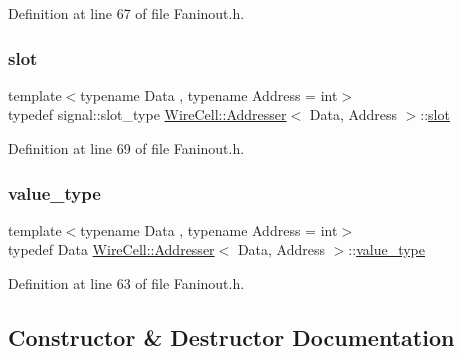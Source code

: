 Definition at line 67 of file Faninout.\+h.

\mbox{\label{class_wire_cell_1_1_addresser_a3c52496ae06c731123d9d7d8ba426ac3}} 
\subsubsection{\texorpdfstring{slot}{slot}}
{\footnotesize\ttfamily template$<$typename Data , typename Address  = int$>$ \\
typedef signal\+::slot\+\_\+type \hyperlink{class_wire_cell_1_1_addresser}{Wire\+Cell\+::\+Addresser}$<$ Data, Address $>$\+::\hyperlink{class_wire_cell_1_1_addresser_a3c52496ae06c731123d9d7d8ba426ac3}{slot}}



Definition at line 69 of file Faninout.\+h.

\mbox{\label{class_wire_cell_1_1_addresser_a125c54e88bc3ed2233b1730e0a19d82b}} 
\subsubsection{\texorpdfstring{value\+\_\+type}{value\_type}}
{\footnotesize\ttfamily template$<$typename Data , typename Address  = int$>$ \\
typedef Data \hyperlink{class_wire_cell_1_1_addresser}{Wire\+Cell\+::\+Addresser}$<$ Data, Address $>$\+::\hyperlink{class_wire_cell_1_1_addresser_a125c54e88bc3ed2233b1730e0a19d82b}{value\+\_\+type}}



Definition at line 63 of file Faninout.\+h.



\subsection{Constructor \& Destructor Documentation}
\mbox{\label{class_wire_cell_1_1_addresser_a868e4dbaf25c16637e4d953be219a56f}} 
